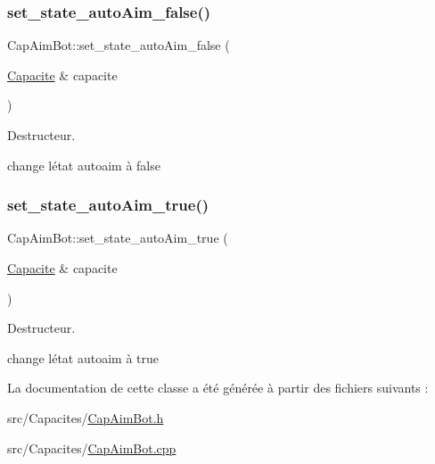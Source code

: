 \subsubsection{\texorpdfstring{set\+\_\+state\+\_\+auto\+Aim\+\_\+false()}{set\_state\_autoAim\_false()}}
{\footnotesize\ttfamily Cap\+Aim\+Bot\+::set\+\_\+state\+\_\+auto\+Aim\+\_\+false (\begin{DoxyParamCaption}\item[{\hyperlink{class_capacite}{Capacite} \&}]{capacite }\end{DoxyParamCaption})}



Destructeur. 

change l\textquotesingle{}état autoaim à false \mbox{\label{class_cap_aim_bot_a79cd2b5ebd0936e133113d5563c31396}} 
\subsubsection{\texorpdfstring{set\+\_\+state\+\_\+auto\+Aim\+\_\+true()}{set\_state\_autoAim\_true()}}
{\footnotesize\ttfamily Cap\+Aim\+Bot\+::set\+\_\+state\+\_\+auto\+Aim\+\_\+true (\begin{DoxyParamCaption}\item[{\hyperlink{class_capacite}{Capacite} \&}]{capacite }\end{DoxyParamCaption})}



Destructeur. 

change l\textquotesingle{}état autoaim à true 

La documentation de cette classe a été générée à partir des fichiers suivants \+:\begin{DoxyCompactItemize}
\item 
src/\+Capacites/\hyperlink{_cap_aim_bot_8h}{Cap\+Aim\+Bot.\+h}\item 
src/\+Capacites/\hyperlink{_cap_aim_bot_8cpp}{Cap\+Aim\+Bot.\+cpp}\end{DoxyCompactItemize}
